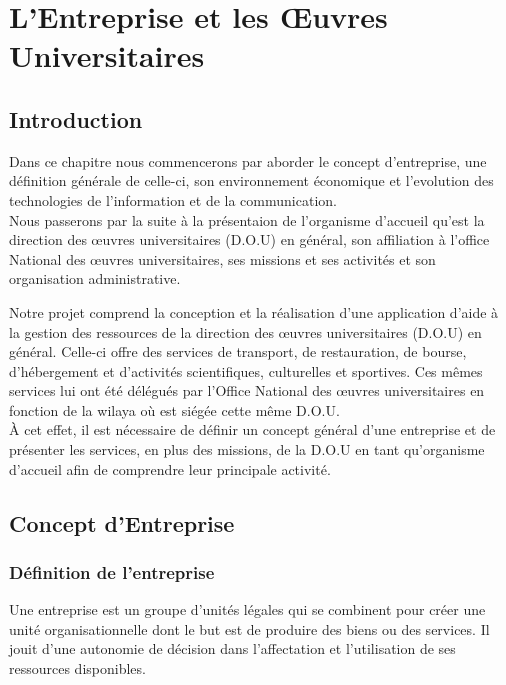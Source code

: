 \chapter{L'Entreprise et les Œuvres Universitaires}

\section{Introduction}
Dans ce chapitre nous commencerons par aborder le concept d'entreprise, une définition générale de celle-ci, son environnement économique et l'evolution des technologies de l'information et de la communication.\\

Nous passerons par la suite à la présentaion de l'organisme d'accueil qu'est la direction des œuvres universitaires (D.O.U) en général, son affiliation à l'office National des œuvres universitaires, ses missions et ses activités et son organisation administrative. 


Notre projet comprend la conception et la réalisation d'une application d'aide à la gestion des ressources de la direction des œuvres universitaires (D.O.U) en général. Celle-ci offre des services de transport, de restauration, de bourse, d'hébergement et d'activités scientifiques, culturelles et sportives. Ces mêmes services lui ont été délégués par l'Office National des œuvres universitaires en fonction de la wilaya où est siégée cette même \acs{D.O.U}.\\

À cet effet, il est nécessaire de définir un concept général d'une entreprise et de  présenter les services, en plus des missions, de la \acs{D.O.U} en tant qu'organisme d'accueil afin de comprendre leur principale activité.\\

\section{Concept d’Entreprise}
\subsection{Définition de l’entreprise \cite{def-entreprise}}
Une entreprise est un groupe d'unités légales qui se combinent pour créer une unité organisationnelle dont le but est de produire des biens ou des services. Il jouit d'une autonomie de décision dans l'affectation et l'utilisation de ses ressources disponibles.\\

